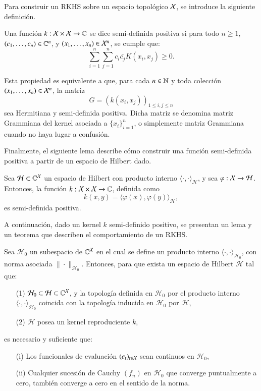\noindent Para construir un RKHS sobre un espacio topológico \( \mathcal{X} \), se introduce la siguiente definición.

\begin{defn}  
Una función \( k: \mathcal{X} \times \mathcal{X} \to \mathbb{C} \) se dice semi-definida positiva si para todo \( n \geq 1 \), \( (c_1, \dots, c_n) \in \mathbb{C}^n \), y \( (x_1, \dots, x_n) \in \mathcal{X}^n \), se cumple que:
\[
\sum_{i=1}^n \sum_{j=1}^n c_i \bar{c_j} K(x_i, x_j) \geq 0.
\]
\end{defn}

\noindent Esta propiedad es equivalente a que, para cada \( n \in \mathbb{N} \) y toda colección \( (x_1, \dots, x_n) \in \mathcal{X}^n \), la matriz  
\[
G = \left( k(x_i, x_j) \right)_{1 \leq i, j \leq n}
\]
sea Hermitiana y semi-definida positiva. Dicha matriz se denomina matriz Grammiana del kernel asociada a \( \{ x_i \}_{i=1}^n \), o simplemente matriz Grammiana cuando no haya lugar a confusión.

Finalmente, el siguiente lema describe cómo construir una función semi-definida positiva a partir de un espacio de Hilbert dado.

\begin{lema}
Sea \( \mathcal{H} \subset \mathbb{C}^{\mathcal{X}} \) un espacio de Hilbert con producto interno \( \langle \cdot, \cdot \rangle_\mathcal{H} \), y sea \( \varphi : \mathcal{X} \to \mathcal{H} \). Entonces, la función \( k: \mathcal{X} \times \mathcal{X} \to \mathbb{C} \), definida como
\[
k(x,y) = \langle \varphi(x), \varphi(y) \rangle_\mathcal{H},
\]
es semi-definida positiva.
\end{lema}

\noindent A continuación, dado un kernel \( k \) semi-definido positivo, se presentan un lema y un teorema que describen el comportamiento de un RKHS.

\begin{lema}
Sea \( \mathcal{H}_0 \) un subespacio de \( \mathbb{C}^{\mathcal{X}} \) en el cual se define un producto interno \( \langle \cdot, \cdot \rangle_{\mathcal{H}_0} \), con norma asociada \( \|\cdot\|_{\mathcal{H}_0} \). Entonces, para que exista un espacio de Hilbert \( \mathcal{H} \) tal que:
\begin{enumerate}
    \item[(1)] \( \mathcal{H}_0 \subset \mathcal{H} \subset \mathbb{C}^{\mathcal{X}} \), y la topología definida en \( \mathcal{H}_0 \) por el producto interno \( \langle \cdot, \cdot \rangle_{\mathcal{H}_0} \) coincida con la topología inducida en \( \mathcal{H}_0 \) por \( \mathcal{H} \),
    \item[(2)] \( \mathcal{H} \) posea un kernel reproduciente \( k \),
\end{enumerate}
es necesario y suficiente que:
\begin{enumerate}
    \item[(i)] Los funcionales de evaluación \( (e_t)_{t \in \mathcal{X}} \) sean continuos en \( \mathcal{H}_0 \),
    \item[(ii)] Cualquier sucesión de Cauchy \( (f_n) \) en \( \mathcal{H}_0 \) que converge puntualmente a cero, también converge a cero en el sentido de la norma.
\end{enumerate}
\end{lema}

